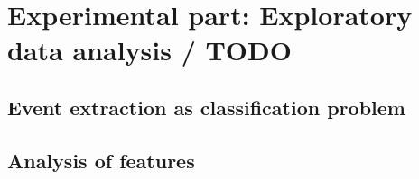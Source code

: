 \chapter{Experimental part: Exploratory data analysis / TODO}
\label{chap:dataexplore}
\section{Event extraction as classification problem}
\section{Analysis of features}